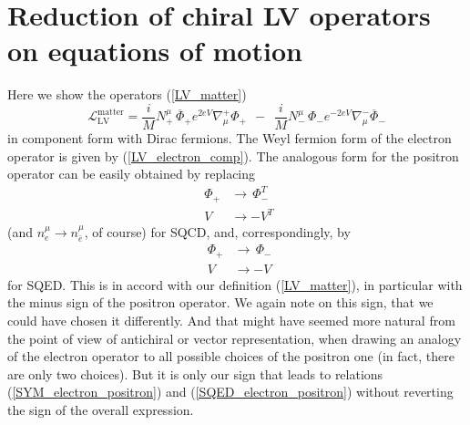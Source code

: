 \documentclass[12pt]{revtex4}
\begin{document}
\section{Reduction of chiral LV operators on equations of motion}
\label{app_reduction}
Here we show the operators (\ref{LV_matter})
\[
\mathcal{L}_{\mathrm{LV}}^{\mathrm{matter}} = 
           \frac{i}{M} N_+^\mu\, \overline{\Phi}_+ e^{2eV} 
\nabla^+_\mu \Phi_+ 
~~
-~~ \frac{i}{M} N_-^\mu\, 
                          \Phi_- e^{-2eV} \nabla^-_\mu 
  \overline{\Phi}_-
\]
    in component form with Dirac fermions.
The Weyl fermion form of the electron operator
is given by (\ref{LV_electron_comp}). 
The analogous form for the positron operator can
be easily obtained by replacing
\begin{eqnarray}
\nonumber
& \Phi_+ & \to \,\Phi_-^T \\
\label{SYM_electron_positron}
& V      & \to - V^T~~
\end{eqnarray}
(and $ n_e^\mu \to n_{\bar{e}}^\mu $, of course)
for SQCD, and, correspondingly, by
\begin{eqnarray}
\nonumber
& \Phi_+ & \to \,\Phi_- \\
\label{SQED_electron_positron}
& V      & \to - V~~
\end{eqnarray}
for SQED.
This is in accord with our definition (\ref{LV_matter}), in
particular with the minus sign of the positron operator.
We again note on this sign, that we could have chosen it
differently.
And that might have seemed more natural from the point
of view of antichiral or vector representation, when
drawing an analogy of the electron operator to 
all possible choices of the positron one (in fact,
there are only two choices).
But it is only our sign that leads to relations
(\ref{SYM_electron_positron}) and (\ref{SQED_electron_positron})
without reverting the sign of the overall expression.
\end{document}
